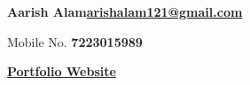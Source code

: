 \documentclass{article}%
\begin{document}
\begin{flushleft}
\textbf{\Large{\huge Aarish Alam}}\hfill{\textbf{\href{mailto:arishalam121@gmail.com}{arishalam121@gmail.com}}}
\end{flushleft}
\vspace{-2mm}
\hfill{Mobile No. \textbf{7223015989}}

\begin{flushleft}
\vspace{-2mm}
{\href{https://behavior.systems/}{\textbf{Portfolio Website}}}\hfill
\begin{minipage}{0.4\textwidth}
\raggedleft
\href{https://github.com/RheagalFire}{\faGithub}\hspace{2mm}
\href{https://www.linkedin.com/in/aarish-alam/}{\faLinkedin}\hspace{2mm}
\href{https://arishalam121.medium.com/}{\faMedium}\hspace{2mm}
\href{https://www.kaggle.com/arishalam}{\faKaggle}
\end{minipage}
\end{flushleft}
\end{document}

